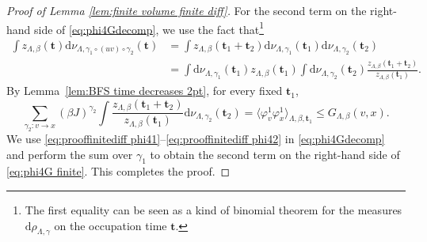 \documentclass[11pt,a4paper]{article}
\numberwithin{equation}{section}
\theoremstyle{plain}
\theoremstyle{definition}
\newcommand\1{\mathds{1}}
\newcommand{\D}{\mathrm{d}}
\begin{document}
\begin{proof}[Proof of Lemma \textup{\ref{lem:finite volume finite diff}}]
For the second term on the right-hand side of \eqref{eq:phi4Gdecomp}, we use the fact
that\footnote{The first equality can be seen as a kind of binomial theorem for the measures $\mathrm{d}\rho_{\Lambda,\gamma}$ on the occupation time $\mathbf{t}$.}
\begin{align}
	\int z_{\Lambda,\beta}(\mathbf{t}) \mathrm{d}\nu_{\Lambda,\gamma_1\circ (uv)\circ \gamma_2}(\mathbf{t})
    & =
    \int z_{\Lambda,\beta}(\mathbf{t}_1+\mathbf{t}_2) \mathrm{d}\nu_{\Lambda,\gamma_1}(\mathbf{t}_1)\mathrm{d}\nu_{\Lambda,\gamma_2}(\mathbf{t}_2)
    \nonumber \\ & =
    \int \mathrm{d}\nu_{\Lambda,\gamma_1}(\mathbf{t}_1)
    z_{\Lambda,\beta}(\mathbf{t}_1)
    \int \mathrm{d}\nu_{\Lambda,\gamma_2}(\mathbf{t}_2)
    \frac{z_{\Lambda,\beta}(\mathbf{t}_1+\mathbf{t}_2) } {z_{\Lambda,\beta}(\mathbf{t}_1)}
    .\label{eq:prooffinitediff phi41}
\end{align}
By Lemma~\ref{lem:BFS time decreases 2pt},
for every fixed $\mathbf{t}_1$,
\begin{equation}
	\sum_{\gamma_2:v\rightarrow x}(\beta J)^{\gamma_2}
    \int \frac{z_{\Lambda,\beta}(\mathbf{t}_1+\mathbf{t}_2) } {z_{\Lambda,\beta}(\mathbf{t}_1)}\D\nu_{\Lambda,\gamma_2}(\mathbf{t}_2)
    =\langle \varphi_v^1\varphi_x^1\rangle_{\Lambda,\beta,\mathbf{t}_1}
    \leq G_{\Lambda,\beta}(v,x).\label{eq:prooffinitediff phi42}
\end{equation}
We use \eqref{eq:prooffinitediff phi41}--\eqref{eq:prooffinitediff phi42} in
\eqref{eq:phi4Gdecomp} and perform the sum
over $\gamma_1$ to obtain the second term on the right-hand side of \eqref{eq:phi4G finite}.
This completes the proof.
\end{proof}
\end{document}
